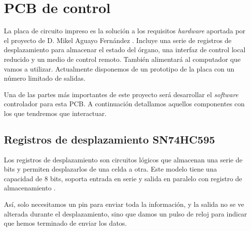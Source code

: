 \smallskip

\section{PCB de control}

La placa de circuito impreso es la solución a los requisitos \textit{hardware} aportada por el proyecto de D. Mikel Aguayo Fernández \cite{mikel}. Incluye una serie de registros de desplazamiento para almacenar el estado del órgano, una interfaz de control local reducido y un medio de control remoto. También alimentará al computador que vamos a utilizar. Actualmente disponemos de un prototipo de la placa con un número limitado de salidas.

Una de las partes más importantes de este proyecto será desarrollar el \textit{software} controlador para esta \acrshort{PCB}. A continuación detallamos aquellos componentes con los que tendremos que interactuar.

\subsection{Registros de desplazamiento SN74HC595}

Los registros de desplazamiento son circuitos lógicos que almacenan una serie de bits y permiten desplazarlos de una celda a otra. Este modelo tiene una capacidad de 8 bits, soporta entrada en serie y salida en paralelo con registro de almacenamiento \cite{shiftreg}. 

Así, solo necesitamos un pin para enviar toda la información, y la salida no se ve alterada durante el desplazamiento, sino que damos un pulso de reloj para indicar que hemos terminado de enviar los datos.

\smallskip


